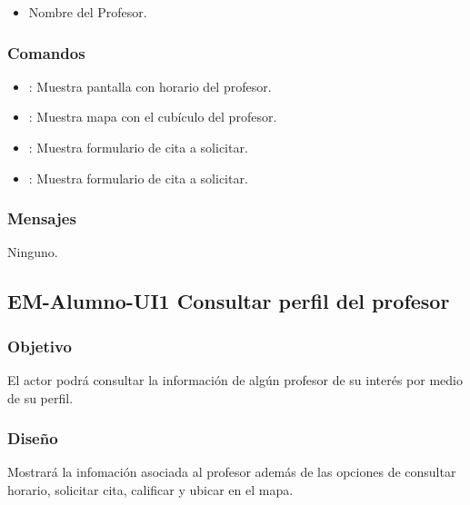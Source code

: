 \begin{itemize}
	\item Nombre del Profesor.
\end{itemize}

\subsubsection{Comandos}
\begin{itemize}
	\item {}: Muestra pantalla con horario del profesor.
	\item {}: Muestra mapa con el cubículo del profesor.
	\item {}: Muestra formulario de cita a solicitar.
	\item {}: Muestra formulario de cita a solicitar.
\end{itemize}

\subsubsection{Mensajes}
\begin{Citemize}
	\item Ninguno.
\end{Citemize}




\pagebreak
\subsection{EM-Alumno-UI1 Consultar perfil del profesor}

\subsubsection{Objetivo}
	El actor podrá consultar la información de algún profesor de su interés por medio de su perfil.

\subsubsection{Diseño}
	Mostrará la infomación asociada al profesor además de las opciones de consultar horario, solicitar cita, calificar y ubicar en el mapa. 

